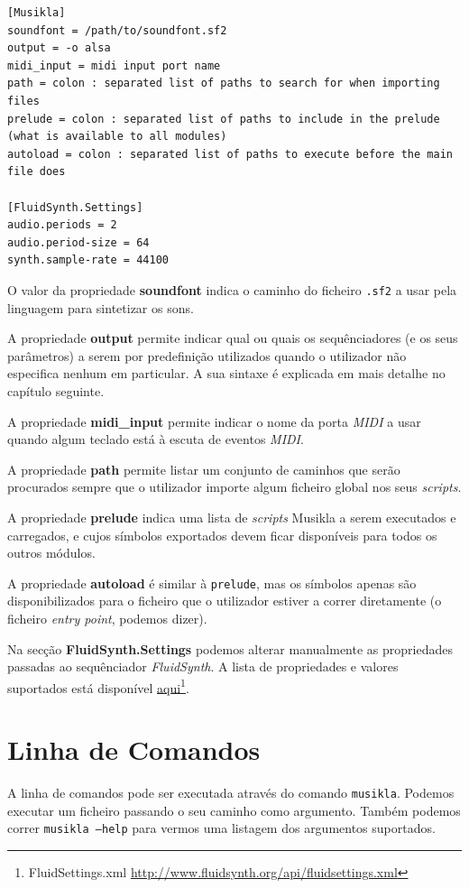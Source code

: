 \begin{lstlisting}[caption={Exemplo de um ficheiro de configuração da linguagem},label={lst:configuration-file}]
[Musikla]
soundfont = /path/to/soundfont.sf2
output = -o alsa
midi_input = midi input port name
path = colon : separated list of paths to search for when importing files
prelude = colon : separated list of paths to include in the prelude (what is available to all modules)
autoload = colon : separated list of paths to execute before the main file does

[FluidSynth.Settings]
audio.periods = 2
audio.period-size = 64
synth.sample-rate = 44100
\end{lstlisting}

O valor da propriedade \textbf{soundfont} indica o caminho do ficheiro \texttt{.sf2} a usar pela linguagem para sintetizar os sons.

A propriedade \textbf{output} permite indicar qual ou quais os sequênciadores (e os seus parâmetros) a serem por predefinição utilizados quando o utilizador não especifica nenhum em particular. A sua sintaxe é explicada em mais detalhe no capítulo seguinte.

A propriedade \textbf{midi\_input} permite indicar o nome da porta \textit{MIDI} a usar quando algum teclado está à escuta de eventos \textit{MIDI}.

A propriedade \textbf{path} permite listar um conjunto de caminhos que serão procurados sempre que o utilizador importe algum ficheiro global nos seus \textit{scripts}.

A propriedade \textbf{prelude} indica uma lista de \textit{scripts} Musikla a serem executados e carregados, e cujos símbolos exportados devem ficar disponíveis para todos os outros módulos.

A propriedade \textbf{autoload} é similar à \texttt{prelude}, mas os símbolos apenas são disponibilizados para o ficheiro que o utilizador estiver a correr diretamente (o ficheiro \textit{entry point}, podemos dizer).

Na secção \textbf{FluidSynth.Settings} podemos alterar manualmente as propriedades passadas ao sequênciador \textit{FluidSynth}. A lista de propriedades e valores suportados está disponível \href{http://www.fluidsynth.org/api/fluidsettings.xml}{aqui}\footnote{FluidSettings.xml \url{http://www.fluidsynth.org/api/fluidsettings.xml}}.


\section{Linha de Comandos}
A linha de comandos pode ser executada através do comando \texttt{musikla}. Podemos executar um ficheiro passando o seu caminho como argumento. Também podemos correr \texttt{musikla --help} para vermos uma listagem dos argumentos suportados.

